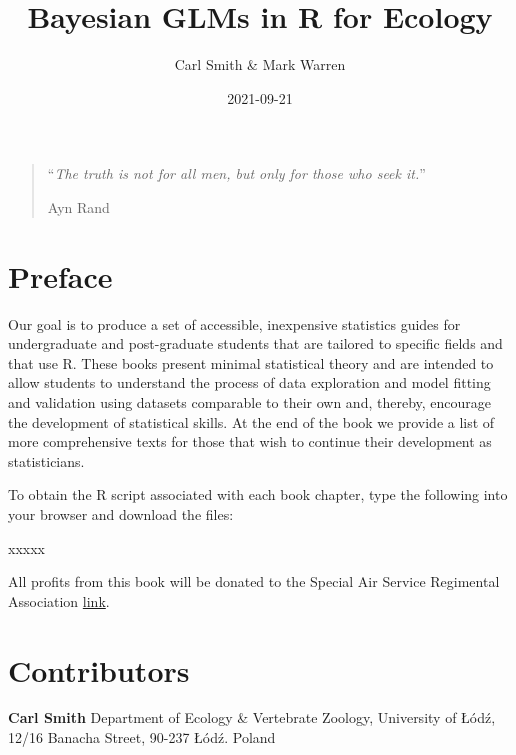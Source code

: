 \documentclass[
]{book}
\title{Bayesian GLMs in R for Ecology}
\author{Carl Smith \& Mark Warren}
\date{2021-09-21}
\begin{document}
\frontmatter
\maketitle

{
\setcounter{tocdepth}{1}
\tableofcontents
}
\mainmatter
\hypertarget{section}{%
\chapter*{}\label{section}}

\begin{quote}
``\emph{The truth is not for all men, but only for those who seek it.}''

Ayn Rand
\end{quote}

\hypertarget{preface}{%
\chapter*{Preface}\label{preface}}

Our goal is to produce a set of accessible, inexpensive statistics
guides for undergraduate and post-graduate students that are tailored to
specific fields and that use R. These books present minimal statistical
theory and are intended to allow students to understand the process of
data exploration and model fitting and validation using datasets
comparable to their own and, thereby, encourage the development of
statistical skills. At the end of the book we provide a list of more
comprehensive texts for those that wish to continue their development as
statisticians.

To obtain the R script associated with each book chapter, type the
following into your browser and download the files:

xxxxx

All profits from this book will be donated to the Special Air Service
Regimental Association \href{https://www.marsandminerva.co.uk}{link}.

\hypertarget{contributors}{%
\chapter*{Contributors}\label{contributors}}

\textbf{Carl Smith} Department of Ecology \& Vertebrate Zoology,
University of Łódź, 12/16 Banacha Street, 90-237 Łódź. Poland
\end{document}
